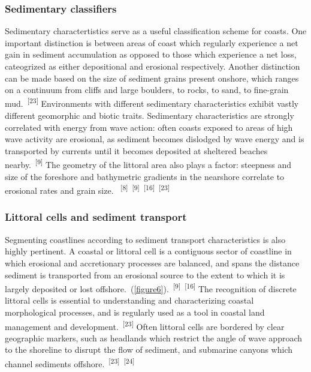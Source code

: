 \documentclass{article}
\begin{document}
\subsubsection{Sedimentary classifiers}


\par{Sedimentary charactertistics serve as a useful classification scheme for coasts. One important distinction is between areas of coast which regularly experience a net gain in sediment accumulation as opposed to those which experience a net loss, cateogrized as either depositional and erosional respectively. Another distinction can be made based on the size of sediment grains present onshore, which ranges on a continuum from cliffs and large boulders, to rocks, to sand, to fine-grain mud.~\textsuperscript{[23]} Environments with different sedimentary characteristics exhibit vastly different geomorphic and biotic traits. Sedimentary characteristics are strongly correlated with energy from wave action: often coasts exposed to areas of high wave activity are erosional, as sediment becomes dislodged by wave energy and is transported by currents until it becomes deposited at sheltered beaches nearby.~\textsuperscript{[9]} The geometry of the littoral area also plays a factor: steepness and size of the foreshore and bathymetric gradients in the nearshore correlate to erosional rates and grain size. ~\textsuperscript{[8]}~\textsuperscript{[9]}~\textsuperscript{[16]}~\textsuperscript{[23]}}

\subsubsection{Littoral cells and sediment transport}


\par{Segmenting coastlines according to sediment transport characteristics is also highly pertinent. A coastal or littoral cell is a contiguous sector of coastline in which erosional and accretionary processes are balanced, and spans the distance sediment is transported from an erosional source to the extent to which it is largely deposited or lost offshore.~(\cref{figure6}).~\textsuperscript{[9]}~\textsuperscript{[16]} The recognition of discrete littoral cells is essential to understanding and characterizing coastal morphological processes, and is regularly used as a tool in coastal land management and development.~\textsuperscript{[23]} Often littoral cells are bordered by clear geographic markers, such as headlands which restrict the angle of wave approach to the shoreline to disrupt the flow of sediment, and submarine canyons which channel sediments offshore.~\textsuperscript{[23]}~\textsuperscript{[24]} \par}
\end{document}
